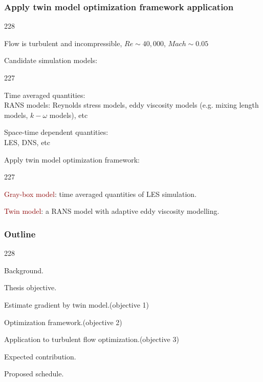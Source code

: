 \documentclass{beamer}
\let\oldcite=\cite
\renewcommand{\cite}[1]{\textcolor[rgb]{.4,.4,.85}{\oldcite{#1}}}
\newcommand{\barrow}{\item[\color{darkred}\ding{228}]}
\newcommand{\carrow}{\item[\color{darkred}\ding{227}]}
\begin{document}
\begin{frame}
    \frametitle{Apply twin model optimization framework \hfill \scriptsize{application}}\small
    \begin{dinglist}{228}
        \barrow Flow is turbulent and incompressible, $Re\sim 40,000$, $Mach\sim 0.05$\vspace{.15cm}
        \barrow Candidate simulation models: \vspace{.1cm}
                \begin{dinglist}{227}
                    \carrow Time averaged quantities: \\\scriptsize\vspace{.1cm}
                    RANS models: Reynolds stress models, eddy viscosity models 
                    (e.g. mixing length models, $k-\omega$ models), etc  \cite{Wilcox 98}
                    \small \vspace{.15cm}
                    \carrow Space-time dependent quantities:\\\scriptsize\vspace{.1cm}
                    LES, DNS, etc
                \end{dinglist}\vspace{.1cm}
        \barrow Apply twin model optimization framework:\vspace{.15cm}
                \begin{dinglist}{227}
                    \carrow \textcolor{darkred}{Gray-box model}: time averaged quantities of LES simulation.\vspace{.15cm}
                    \carrow \textcolor{darkred}{Twin model}: a RANS model with adaptive eddy viscosity modelling.
                \end{dinglist}
   \end{dinglist}
\end{frame}

\begin{frame}
    \frametitle{Outline}\small
    \begin{dinglist}{228}
        \barrow {} Background.
        \barrow Thesis objective.
        \vspace{.35cm}
        \barrow Estimate gradient by twin model.\hfill(objective 1)
        \barrow Optimization framework.\hfill(objective 2)
        \barrow Application to turbulent flow optimization.\hfill(objective 3)\\
        \vspace{.35cm}
        \barrow Expected contribution.
        \barrow Proposed schedule.
    \end{dinglist}
\end{frame}
\end{document}
